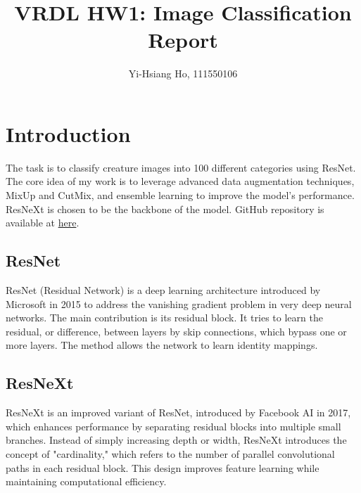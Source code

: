 \documentclass[10pt,twocolumn,letterpaper]{article}
\begin{document}
\title{VRDL HW1: Image Classification Report}

\author{Yi-Hsiang Ho, 111550106
}
\maketitle

\section{Introduction}
\label{sec:intro}

The task is to classify creature images into 100 different categories using ResNet.
The core idea of my work is to leverage advanced data augmentation techniques,
MixUp and CutMix, and ensemble learning to improve the model's performance. ResNeXt
is chosen to be the backbone of the model. GitHub repository is available
at \href{https://github.com/Sean20405/NYCU-DLVR-HW1}{here}.

\subsection{ResNet}

ResNet (Residual Network) is a deep learning architecture introduced by Microsoft
in 2015 to address the vanishing gradient problem in very deep neural networks.
The main contribution is its residual block. It tries to learn the residual, or
difference, between layers by skip connections, which bypass one or more layers.
The method allows the network to learn identity mappings.

\subsection{ResNeXt}

ResNeXt is an improved variant of ResNet, introduced by Facebook AI in 2017,
which enhances performance by separating residual blocks into multiple small
branches. Instead of simply increasing depth or width, ResNeXt introduces the
concept of "cardinality," which refers to the number of parallel convolutional
paths in each residual block. This design improves feature learning while
maintaining computational efficiency.~\cite{Xie2016}
\end{document}
